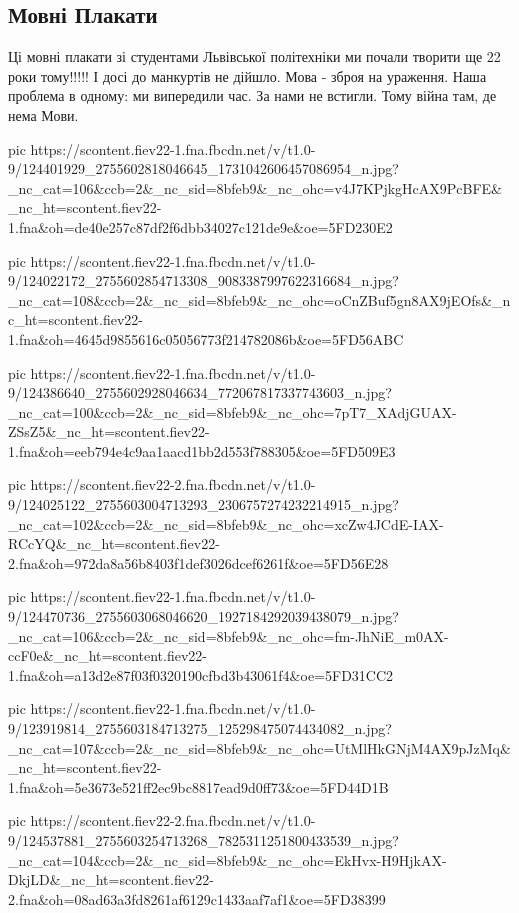  
 
 

\subsection{Мовні Плакати}

Ці мовні плакати зі студентами Львівської політехніки ми почали творити ще 22
роки тому!!!!! І досі до манкуртів не дійшло. Мова - зброя на ураження. Наша
проблема в одному: ми випередили час. За нами не встигли. Тому війна там, де
нема Мови.

\ifcmt
pic https://scontent.fiev22-1.fna.fbcdn.net/v/t1.0-9/124401929_2755602818046645_1731042606457086954_n.jpg?_nc_cat=106&ccb=2&_nc_sid=8bfeb9&_nc_ohc=v4J7KPjkgHcAX9PcBFE&_nc_ht=scontent.fiev22-1.fna&oh=de40e257c87df2f6dbb34027c121de9e&oe=5FD230E2

pic https://scontent.fiev22-1.fna.fbcdn.net/v/t1.0-9/124022172_2755602854713308_9083387997622316684_n.jpg?_nc_cat=108&ccb=2&_nc_sid=8bfeb9&_nc_ohc=oCnZBuf5gn8AX9jEOfs&_nc_ht=scontent.fiev22-1.fna&oh=4645d9855616c05056773f214782086b&oe=5FD56ABC

pic https://scontent.fiev22-1.fna.fbcdn.net/v/t1.0-9/124386640_2755602928046634_772067817337743603_n.jpg?_nc_cat=100&ccb=2&_nc_sid=8bfeb9&_nc_ohc=7pT7_XAdjGUAX-ZSsZ5&_nc_ht=scontent.fiev22-1.fna&oh=eeb794e4c9aa1aacd1bb2d553f788305&oe=5FD509E3

pic https://scontent.fiev22-2.fna.fbcdn.net/v/t1.0-9/124025122_2755603004713293_2306757274232214915_n.jpg?_nc_cat=102&ccb=2&_nc_sid=8bfeb9&_nc_ohc=xcZw4JCdE-IAX-RCcYQ&_nc_ht=scontent.fiev22-2.fna&oh=972da8a56b8403f1def3026dcef6261f&oe=5FD56E28

pic https://scontent.fiev22-1.fna.fbcdn.net/v/t1.0-9/124470736_2755603068046620_1927184292039438079_n.jpg?_nc_cat=106&ccb=2&_nc_sid=8bfeb9&_nc_ohc=fm-JhNiE_m0AX-ccF0e&_nc_ht=scontent.fiev22-1.fna&oh=a13d2e87f03f0320190cfbd3b43061f4&oe=5FD31CC2

pic https://scontent.fiev22-1.fna.fbcdn.net/v/t1.0-9/123919814_2755603184713275_125298475074434082_n.jpg?_nc_cat=107&ccb=2&_nc_sid=8bfeb9&_nc_ohc=UtMlHkGNjM4AX9pJzMq&_nc_ht=scontent.fiev22-1.fna&oh=5e3673e521ff2ec9bc8817ead9d0ff73&oe=5FD44D1B

pic https://scontent.fiev22-2.fna.fbcdn.net/v/t1.0-9/124537881_2755603254713268_7825311251800433539_n.jpg?_nc_cat=104&ccb=2&_nc_sid=8bfeb9&_nc_ohc=EkHvx-H9HjkAX-DkjLD&_nc_ht=scontent.fiev22-2.fna&oh=08ad63a3fd8261af6129c1433aaf7af1&oe=5FD38399

\fi
